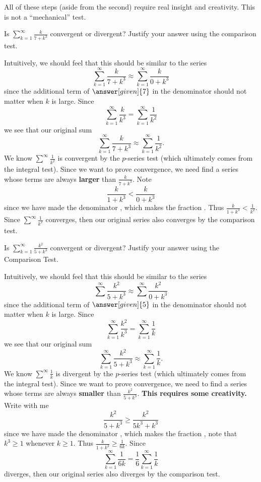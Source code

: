 \documentclass{ximera}
\begin{document}
All of these steps (aside from the second) require real insight and
creativity.  This is not a ``mechanical'' test.

\begin{example}
Is $\sum_{k=1}^\infty \frac{k}{7+k^3}$ convergent or divergent?
Justify your answer using the comparison test.
\begin{explanation}
  Intuitively, we should feel that this should be similar to the
  series
  \[
  \sum_{k=1}^\infty \frac{k}{7+ k^3} \approx \sum_{k=1}^\infty \frac{k}{0+k^3}
  \]
  since the additional term of $\answer[given]{7}$ in the denominator
  should not matter when $k$ is large. Since
  \[
  \sum_{k=1}^\infty \frac{k}{k^3} =\sum_{k=1}^\infty \frac{1}{k^2}
  \]
  we see that our original sum
  \[
  \sum_{k=1}^\infty \frac{k}{7+ k^3} \approx \sum_{k=1}^\infty \frac{1}{k^2}.
  \]
  We know $\sum^\infty \frac{1}{k^2}$ is convergent by the $p$-series
  test (which ultimately comes from the integral test).  Since we want
  to prove convergence, we need find a series whose terms are always
  \textbf{larger} than $\frac{k}{7+ k^3}$. Note
  \[
  \frac{k}{1+k^3} < \frac{k}{0+k^3}
  \]
  since we have made the denominator
  , which makes
  the fraction .
  Thus $\frac{k}{1+k^3} < \frac{1}{k^2}$.  Since $\sum^\infty
  \frac{1}{k^2}$ converges, then our original series also converges by
  the comparison test.
\end{explanation}
\end{example}





\begin{example}
Is $\sum_{k=1}^\infty \frac{k^2}{5+k^3}$ convergent or divergent?
Justify your answer using the Comparison Test.
\begin{explanation}
  Intuitively, we should feel that this should be similar to the
  series
  \[
  \sum^\infty \frac{k^2}{5+k^3} \approx \sum^\infty \frac{k^2}{0+k^3}
  \]
  since the additional term of $\answer[given]{5}$ in the denominator should not
  matter when $k$ is large. Since
  \[
  \sum_{k=1}^\infty \frac{k^2}{k^3} =\sum_{k=1}^\infty \frac{1}{k}
  \]
  we see that our original sum
  \[
  \sum_{k=1}^\infty \frac{k^2}{5+ k^3} \approx \sum_{k=1}^\infty \frac{1}{k}.
  \]
  We know $\sum^\infty \frac{1}{k}$ is divergent by the $p$-series
  test (which ultimately comes from the integral test).  Since we want
  to prove convergence, we need to find a series whose terms are
  always \textbf{smaller} than $\frac{k^2}{5+ k^3}$. \textbf{This
    requires some creativity.} Write with me
  \[
  \frac{k^2}{5+k^3} \geq \frac{k^2}{5k^3+k^3} 
  \]
  since we have made the denominator
  , which makes
  the fraction ,
  note that $k^3 \geq 1$ whenever $k \geq 1$.  Thus $\frac{k}{1+k^3}
  \geq \frac{1}{6k}$.  Since
  \[
  \sum_{k=1}^\infty\frac{1}{6k} = \frac{1}{6} \sum_{k=1}^\infty
  \frac{1}{k}
  \]
  diverges, then our original series also diverges by the comparison
  test.
\end{explanation}
\end{example}
\end{document}
